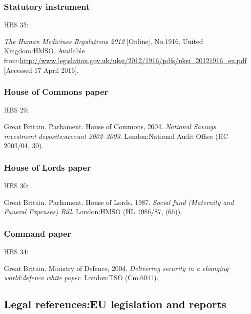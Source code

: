 \subsubsection*{Statutory instrument}

HBS 35: \cite{gb.hmr2012}

\emph{The Human Medicines Regulations 2012} [Online], No.1916, United Kingdom:\@ HMSO. Available from:\@ \url{http://www.legislation.gov.uk/uksi/2012/1916/pdfs/uksi_20121916_en.pdf} [Accessed 17 April 2016].




\subsubsection*{House of Commons paper}

HBS 29: \cite{gb.hc2003/04-30}

Great Britain. Parliament. House of Commons, 2004. \emph{National Savings investment deposits:\@ account 2002--2003}. London:\@ National Audit Office (HC 2003/04, 30).



\subsubsection*{House of Lords paper}

HBS 30: \cite{gb.hl1986/87-66}

Great Britain. Parliament. House of Lords, 1987. \emph{Social fund (Maternity and Funeral Expenses) Bill}. London:\@ HMSO (HL 1986/87, (66)).



\subsubsection*{Command paper}

HBS 34: \cite{gb.cm6041}

Great Britain. Ministry of Defence, 2004. \emph{Delivering security in a changing world:\@ defence white paper}. London:\@ TSO (Cm.\@ 6041).



\subsection{Legal references:\@ EU legislation and reports}


